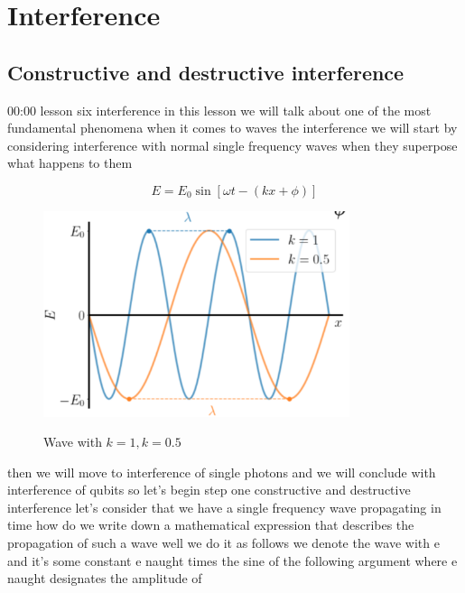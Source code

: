 \chapter{Interference}

\section{Constructive and destructive interference}

00:00
lesson six interference in this lesson we will talk about one of
the most fundamental phenomena when it comes to waves the interference
we will start by considering interference with normal
single frequency waves when they superpose what happens to them

\begin{equation}
E=E_{0} \sin [\omega t-(k x+\phi)]
\end{equation}
\begin{figure}[H]
   \centering
    \includegraphics[width=0.8\textwidth]{lesson6/k.pdf}
    \label{fig: 1}
    \begin{center}
        \caption{Wave with $k=1, k=0.5$}
    \end{center}
\end{figure}

then we will move to interference of single photons
and we will conclude with interference of qubits
so let's begin step one constructive and destructive interference
let's consider that we have a single frequency wave propagating in time
how do we write down a mathematical expression that describes the
propagation of such a wave well we do it as follows we denote the wave
with e and it's some constant e naught times the sine of the following argument
where e naught designates the amplitude of

